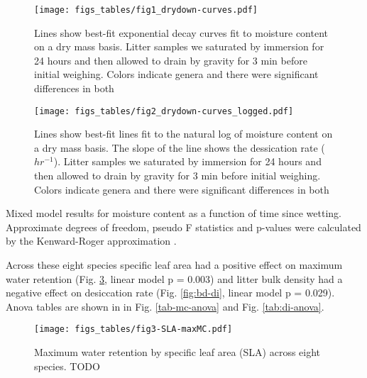 \documentclass[fire,article,submit,moreauthors,pdftex]{Definitions/mdpi}
\begin{document}
\begin{figure}[H]
  \centering
\texttt{[image: figs\_tables/fig1\_drydown-curves.pdf]}
\caption[Dry down curves for eight litter types.]{Lines show best-fit exponential decay curves fit to moisture content on a dry mass basis. Litter samples we saturated by immersion for 24 hours and then allowed to drain by gravity for 3 min before initial weighing. Colors indicate genera and there were significant differences in both }
 \label{fig:drydown}
\end{figure}


\begin{figure}[H]
  \centering
\texttt{[image: figs\_tables/fig2\_drydown-curves\_logged.pdf]}
\caption[Semi-log scale dry down curves for eight litter types.]{Lines show best-fit lines fit to the natural log of moisture content on a dry mass basis.  The slope of the line shows the dessication rate ($hr^{-1}$). Litter samples we saturated by immersion for 24 hours and then allowed to drain by gravity for 3 min before initial weighing. Colors indicate genera and there were significant differences in both }
 \label{fig:drydown-logged}
\end{figure}


\begin{table}[H]
  \caption{Mixed model results for moisture content as a function of time since wetting. Approximate degrees of freedom, pseudo F statistics and p-values were calculated by the Kenward-Roger approximation \cite{Kenward_Roger-1997}.}
  \label{tab:drydown}
\centering

\end{table}

Across these eight species specific leaf area had a positive effect on maximum water retention (Fig. \ref{fig:maxmc-di}, linear model p = 0.003) and litter bulk density had a negative effect on desiccation rate (Fig. \ref{fig:bd-di}, linear model p = 0.029). Anova tables are shown in in Fig. \ref{tab-mc-anova} and Fig. \ref{tab:di-anova}.

\begin{figure}[H]
  \centering
\texttt{[image: figs\_tables/fig3-SLA-maxMC.pdf]}
\caption[Maximum water retention by specific leaf area]{Maximum water retention by specific leaf area (SLA) across eight species.  TODO }
  \label{fig:maxmc-di}
\end{figure}
\end{document}
